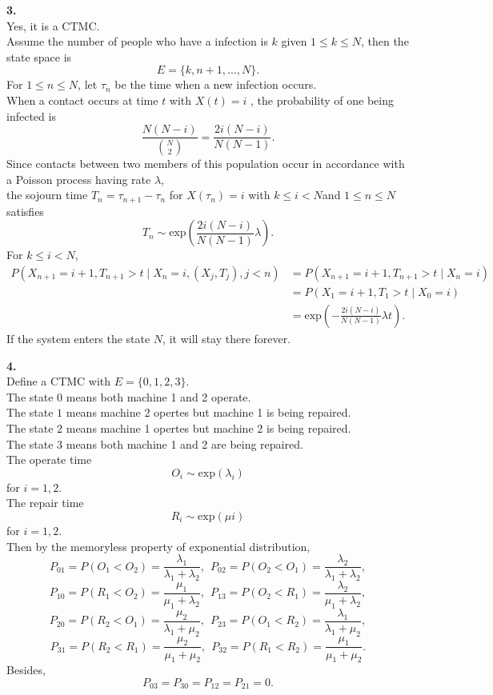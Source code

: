\documentclass{amsart}
\theoremstyle{plain}
\theoremstyle{definition}
\begin{document}
\vspace{3mm}

\noindent \textbf{3.}\\
Yes, it is a CTMC.\\
Assume the number of people who have a infection is $k$ given $1 \leq k \leq N$, then the state space is  
\[E = \{k, n+1,...,N\}.\]
For $1 \leq n \leq N$, let $\tau_n$ be the time when a new infection occurs.\\ 
When a contact occurs at time $t$ with $X(t) = i$ , the probability of one being infected is 
\[\frac{N(N-i)}{{N \choose 2}} = \frac{2i(N-i)}{N(N-1)}.\]  
Since contacts between two members of this population occur in accordance
with a Poisson process having rate $\lambda$,\\
the sojourn time $T_{n} = \tau_{n+1} - \tau_n$ for $X(\tau_n) = i$ with $k \leq i < N $and $1\leq n \leq N$ satisfies 
\[T_n \sim \text{exp}\left(\frac{2i(N-i)}{N(N-1)} \lambda \right).\]
For $k \leq i < N$, 
\begin{align*}
  P(X_{n+1} = i + 1, T_{n+1} > t \mid X_n = i, (X_j, T_j), j <n) &= P(X_{n+1} = i + 1, T_{n+1} > t \mid X_n = i) \\
  &= P(X_{1} = i + 1, T_{1} > t \mid X_0 = i) \\
  &= \text{exp}\left(-\frac{2i(N-i)}{N(N-1)} \lambda t\right).
\end{align*}
If the system enters the state $N$, it will stay there forever.


\noindent \textbf{4.}\\
Define a CTMC with $E = \{0,1,2,3\}$.\\
The state $0$ means both machine 1 and 2 operate.\\
The state $1$ means machine 2 opertes but machine 1 is being repaired.\\
The state $2$ means machine 1 opertes but machine 2 is being repaired.\\
The state $3$ means both machine 1 and 2 are being repaired.\\
The operate time 
\[ O_i \sim \text{exp}(\lambda_i)\]  
for $i = 1,2$. \\
The repair time 
\[R_i \sim \text{exp}(\mu i)\]
for $i= 1,2$.\\
Then by the memoryless property of exponential distribution,
\[P_{01} = P(O_1 < O_2) = \frac{\lambda_1}{\lambda_1 + \lambda_2},\ \ 
P_{02} = P(O_2 < O_1) = \frac{\lambda_2}{\lambda_1 + \lambda_2},\]
\[P_{10} = P(R_1 < O_2) = \frac{\mu_1}{\mu_1 + \lambda_2},\ \ 
P_{13} = P(O_2 < R_1) = \frac{\lambda_2}{\mu_1 + \lambda_2},\]
\[P_{20} = P(R_2 < O_1) = \frac{\mu_2}{\lambda_1 + \mu_2}, \ \
P_{23} = P(O_1 < R_2) = \frac{\lambda_1}{\lambda_1 + \mu_2},\] 
\[P_{31} = P(R_2 < R_1) = \frac{\mu_2}{\mu_1+ \mu_2},\ \
P_{32} = P(R_1 < R_2) = \frac{\mu_1}{\mu_1+ \mu_2}.\]
Besides,
\[P_{03} = P_{30} = P_{12} = P_{21} = 0.\]
\renewcommand{\kbldelim}{(}%
\renewcommand{\kbrdelim}{)}%
\end{document}
